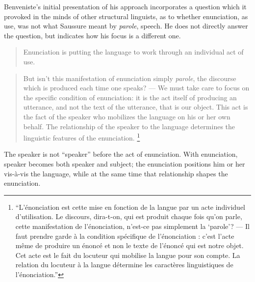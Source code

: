 \documentclass[output=paper]{langscibook}
\begin{document}
Benveniste's initial presentation of his approach incorporates a question which it provoked in the minds of other structural linguists, as to whether enunciation, as use, was not what Saussure meant by \emph{parole}, speech. He does not directly answer the question, but indicates how his focus is a different one.

\begin{quotation}
Enunciation is putting the language to work through an individual act of use.
\end{quotation}

\begin{quotation}
But isn't this manifestation of enunciation simply \emph{parole}, the discourse which is produced each time one speaks? — We must take care to focus on the specific condition of enunciation: it is the act itself of producing an utterance, and not the text of the utterance, that is our object. This act is the fact of the speaker who mobilizes the language on his or her own behalf. The relationship of the speaker to the language determines the linguistic features of the enunciation. \citep[80]{Benveniste1970appareil}\footnote{``L'énonciation est cette mise en fonction de la langue par un acte individuel d'utilisation. Le discours, dira-t-on, qui est produit chaque fois qu'on parle, cette manifestation de l'énonciation, n'est-ce pas simplement la `parole'? — Il faut prendre garde à la condition spécifique de l'énonciation : c’est l'acte même de produire un énoncé et non le texte de l'énoncé qui est notre objet. Cet acte est le fait du locuteur qui mobilise la langue pour son compte. La relation du locuteur à la langue détermine les caractères linguistiques de l'énonciation.''}
\end{quotation}

The speaker is not ``speaker'' before the act of enunciation. With enunciation, speaker becomes both speaker and subject; the enunciation positions him or her vis-à-vis the language, while at the same time that relationship shapes the enunciation.
\end{document}
